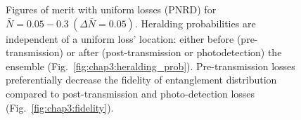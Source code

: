 \documentclass[aps,twocolumn,secnumarabic,amsmath,amssymb,pra,groupedaddress,
showpacs, showkeys,draft]{revtex4-1}
\newcommand{\pna}[1]{\left(#1\right)}
\begin{document}
\begin{figure}[ht]
\centering
{}
\caption{\label{fig:chap3:pnrd_data}Figures of merit with uniform losses (PNRD) for $\bar{N}=0.05-0.3~\pna{\Delta\bar{N}=0.05}$. Heralding probabilities are independent of a uniform loss' location: either before (pre-transmission) or after (post-transmission or photodetection) the ensemble (Fig.~\ref{fig:chap3:heralding_prob}). Pre-transmission losses preferentially decrease the fidelity of entanglement distribution compared to post-transmission and photo-detection losses (Fig.~\ref{fig:chap3:fidelity}).}
\end{figure}
\end{document}

